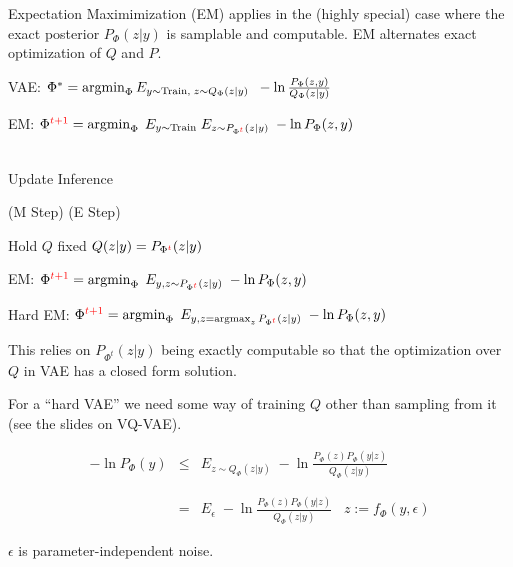 {

Expectation Maximimization (EM) applies in the (highly special) case where the exact posterior $P_\Phi(z|y)$ is samplable and computable.
EM alternates exact optimization of $Q$ and $P$.

\vfill
VAE: $\Phi^* = \operatorname*{argmin}_\Phi E_{y\sim \mathrm{Train},\;z \sim Q_\Phi(z|y)}\;\;- \ln \frac{P_\Phi(z,y)}{Q_\Phi(z|y)}$

\vfill
EM: $\Phi^{\color{red} t+1} =  \operatorname*{argmin}_\Phi\;E_{y \sim \mathrm{Train}}\;E_{z \sim P_{\Phi^{\color{red} t}}(z|y)}\; - \ln P_\Phi(z,y)$ \\
\\
\centerline{\hspace{1em} Update \hspace{6em} Inference \hspace{2.5em}~}
\centerline{(M Step) \hspace{5em} (E Step) \hspace{1.5em}~}
\centerline{Hold $Q$ fixed \hspace{2.5em} $Q(z|y) = P_{\Phi^{\color{red} t}}(z|y)$ \hspace{0em}~}


EM: $\Phi^{\color{red} t+1} =  \operatorname*{argmin}_\Phi\;E_{y,z \sim P_{\Phi^{\color{red} t}}(z|y)}\; - \ln P_\Phi(z,y)$

\vfill
Hard EM: $\Phi^{\color{red} t+1} =  \operatorname*{argmin}_\Phi\; E_{y, z = \operatorname*{argmax}_z P_{\Phi^{\color{red} t}}(z|y)} \;- \ln P_\Phi(z,y)$

\vfill
This relies on $P_{\Phi^t}(z|y)$ being exactly computable so that the optimization over $Q$ in VAE has a closed form solution.

\vfill
For a ``hard VAE'' we need some way of training $Q$ other than sampling from it (see the slides on VQ-VAE).


\begin{eqnarray*}
- \ln P_\Phi(y) & \leq & E_{z \sim Q_\Phi(z|y)}\;-\ln \frac{P_\Phi(z)P_\Phi(y|z)}{Q_\Phi(z|y)} \\
\\
\\
& = & E_\epsilon\;-\ln \frac{P_\Phi(z)P_\Phi(y|z)}{Q_\Phi(z|y)}\;\;\;z := f_\Phi(y,\epsilon)
\end{eqnarray*}

\vfill
$\epsilon$ is parameter-independent noise.

}
